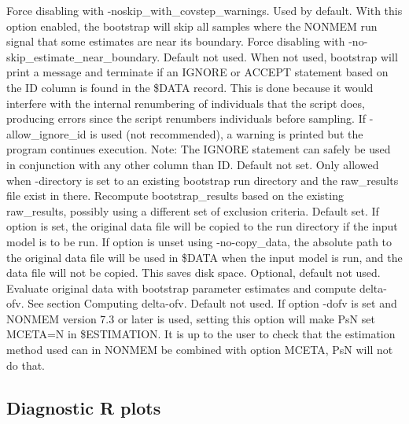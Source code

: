 \begin{optionlist}
      Force disabling with -no\-skip\_with\_covstep\_warnings.
\nextopt
{}
Used by default. With this option enabled, the bootstrap will skip all samples
      where the NONMEM run signal that some estimates are near its
      boundary.
      Force disabling with  -no-skip\_estimate\_near\_boundary.
\nextopt
{}
 Default not used. When not used, bootstrap will print a message and terminate if an IGNORE or ACCEPT statement based on the ID column is found in the \$DATA record. 
	  This is done because it would interfere with the internal renumbering of individuals that the script does, 
	  producing errors since the script renumbers individuals before sampling.
	  If -allow\_ignore\_id is used (not recommended), a warning is printed but the program continues execution. 
	  Note: The IGNORE statement can safely be used in conjunction with any other column than ID.
\nextopt
{}
Default not set. Only allowed when -directory is set to an existing bootstrap run directory and
the raw\_results file exist in there. Recompute bootstrap\_results based on the existing raw\_results,
possibly using a different set of exclusion criteria.
\nextopt
{}
Default set. If option is set, the original data file
will be copied to the run directory if the input model is to be run.
If option is unset using -no-copy\_data, the absolute path to the original data file will be used in
\$DATA when the input model is run, and the data file will not be copied. This saves disk space.
\nextopt
{}
Optional, default not used. Evaluate original data with bootstrap parameter estimates and compute delta-ofv. See section Computing delta-ofv. 
\nextopt
{}
Default not used. If option -dofv is set and NONMEM version 7.3 or later is used, setting this option will make PsN set MCETA=N in \$ESTIMATION. It is up to the user to check that the estimation method used can in NONMEM be 
combined with option MCETA, PsN will not do that.
\nextopt
\end{optionlist}

\subsection{Diagnostic R plots}
\newcommand{\rplotsconditions}{
See section Output, subsections Basic and Extended plots,
for descriptions of the default bootstrap plots.
The default bootstrap template 
requires the xpose4 R library of at least version 4.5.0,
and that R libraries ggplot2, plyr, dplyr are installed.
If the conditions are not fulfilled then no pdf will be generated,
see the .Rout file in the main run directory for error messages.
}


